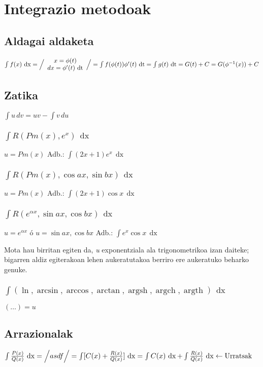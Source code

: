 \documentclass[8pt]{article}
\DeclareMathOperator{\xder}{\, \mathrm{d}x}
\DeclareMathOperator{\tder}{\, \mathrm{d}t}
\DeclareMathOperator{\argsh}{argsh}
\DeclareMathOperator{\argch}{argch}
\DeclareMathOperator{\argth}{argth}
\begin{document}
	\section{Integrazio metodoak}
		\subsection{Aldagai aldaketa}
			$ \int f(x) \xder = \Big{/}
				\begin{array}{c}
					x = \phi (t) \\
					dx = \phi'(t) \tder
				\end{array}
				\Big{/}
				= \int f(\phi(t)) \phi' (t) \tder =
				\int g(t) \tder = G (t) + C = G (\phi^{-1} (x)) + C
			$
		\subsection{Zatika}
			$ \int u \, dv = uv - \int v \, du $

			\subsubsection{$ \int R (Pm(x), e^x) \xder$}
				$ u = Pm(x) $ \quad 
				Adb.: $ \int (2x + 1) e^x \xder $
			\subsubsection{$ \int R (Pm(x), \cos ax, \sin bx) \xder $}
				$ u = Pm(x) $ \quad
				Adb.: $ \int (2x + 1) \cos x \xder $
			\subsubsection{$ \int R (e^{\alpha x}, \sin ax, \cos bx) \xder $}
				$ u = e^{\alpha x} $ ó $ u = \sin ax, \cos bx $ \quad
				Adb.: $ \int e^x \cos x \xder $

				Mota hau birritan egiten da, \textit{u} exponentziala ala
				trigonometrikoa izan daiteke; bigarren aldiz egiterakoan
				lehen aukeratutakoa berriro ere aukeratuko beharko genuke.

			\subsubsection{$ \int (\ln, \arcsin, \arccos, \arctan, \argsh, \argch, \argth ) \xder $}
				$ ( \dots ) = u $
		\subsection{Arrazionalak}
			$ \int \frac{P(x)}{Q(x)} \xder =
				\Big{/}
					asdf
				\Big{/}
				= \int [ C(x) + \frac{R(x)}{Q(x)} ] \xder =
				\int C(x) \xder + \int \frac{R(x)}{Q(x)} \xder \leftarrow \text{Urratsak} $
\end{document}
